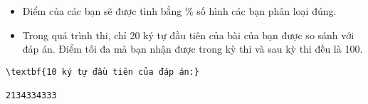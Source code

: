 \begin{itemize}
	\item Điểm của các bạn sẽ được tình bằng \% số hình các bạn phân loại đúng. 
	\item Trong quá trình thi, chỉ 20 ký tự đầu tiên của bài của bạn được so sánh với đáp án. Điểm tối đa mà bạn nhận được trong kỳ thi và sau kỳ thi đều là 100.
\end{itemize}
\begin{verbatim}
\textbf{10 ký tự đầu tiên của đáp án:}

2134334333\end{verbatim}